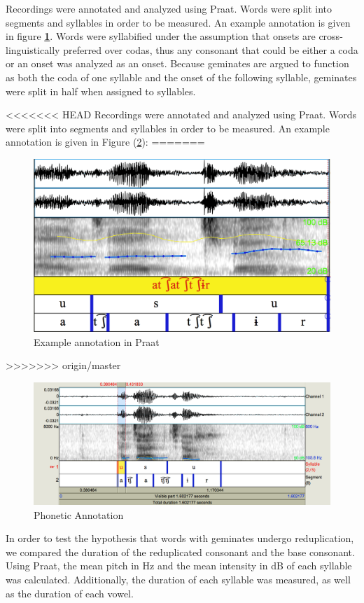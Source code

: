 \documentclass[12pt]{article}
\begin{document}
Recordings were annotated and analyzed using Praat. Words were split into segments and syllables in order to be measured. An example annotation is given in figure \textbf{\ref{fig:annotate}}. Words were syllabified under the assumption that onsets are cross-linguistically preferred over codas, thus any consonant that could be either a coda or an onset was analyzed as an onset. Because geminates are argued to function as both the coda of one syllable and the onset of the following syllable, geminates were split in half when assigned to syllables.

<<<<<<< HEAD
Recordings were annotated and analyzed using Praat. Words were split into segments and syllables in order to be measured. An example annotation is given in Figure (\ref{annotation}):
=======
\begin{figure}[h]
	\centering
	\caption{Example annotation in Praat \label{fig:annotate}}
	\includegraphics[width=.8\textwidth]{exann.png}
\end{figure}
>>>>>>> origin/master

\begin{figure}[ht!]
\center
\includegraphics[width=160mm]{annotationexample.jpg}
\caption{Phonetic Annotation} \label{annotation}
\end{figure}


In order to test the hypothesis that words with geminates undergo reduplication, we compared the duration of the reduplicated consonant and the base consonant. Using Praat, the mean pitch in Hz and the mean intensity in dB of each syllable was calculated. Additionally, the duration of each syllable was measured, as well as the duration of each vowel. 
\end{document}
